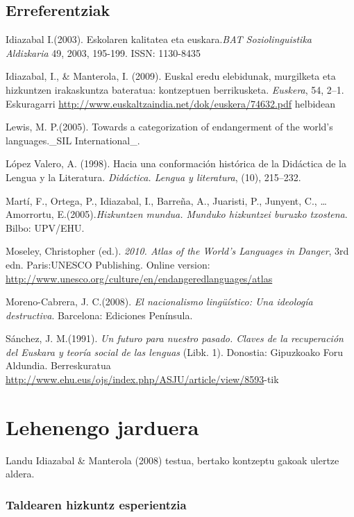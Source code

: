 \documentclass[
]{book}
\begin{document}
\hypertarget{erreferentziak}{%
\section{Erreferentziak}\label{erreferentziak}}

Idiazabal I.(2003). Eskolaren kalitatea eta euskara.\emph{BAT Soziolinguistika Aldizkaria} 49, 2003, 195-199. ISSN: 1130-8435

Idiazabal, I., \& Manterola, I. (2009). Euskal eredu elebidunak, murgilketa eta hizkuntzen irakaskuntza bateratua: kontzeptuen berrikusketa. \emph{Euskera}, 54, 2--1. Eskuragarri \url{http://www.euskaltzaindia.net/dok/euskera/74632.pdf} helbidean

Lewis, M. P.(2005). Towards a categorization of endangerment of the world's languages.\_SIL International\_.

López Valero, A. (1998). Hacia una conformación histórica de la Didáctica de la Lengua y la Literatura. \emph{Didáctica. Lengua y literatura}, (10), 215--232.

Martí, F., Ortega, P., Idiazabal, I., Barreña, A., Juaristi, P., Junyent, C., \ldots{} Amorrortu, E.(2005).\emph{Hizkuntzen mundua. Munduko hizkuntzei buruzko txostena}. Bilbo: UPV/EHU.

Moseley, Christopher (ed.). \emph{2010. Atlas of the World's Languages in Danger}, 3rd edn. Paris:UNESCO Publishing. Online version: \url{http://www.unesco.org/culture/en/endangeredlanguages/atlas}

Moreno-Cabrera, J. C.(2008). \emph{El nacionalismo lingüístico: Una ideología destructiva}. Barcelona: Ediciones Península.

Sánchez, J. M.(1991). \emph{Un futuro para nuestro pasado. Claves de la recuperación del Euskara y teoría social de las lenguas} (Libk. 1). Donostia: Gipuzkoako Foru Aldundia. Berreskuratua \href{http://www.ehu.eus/ojs/index.php/ASJU/article/view/8593-\%28e\%29tik}{http://www.ehu.eus/ojs/index.php/ASJU/article/view/8593}-tik

\hypertarget{lehenengo-jarduera}{%
\chapter*{Lehenengo jarduera}\label{lehenengo-jarduera}}

Landu Idiazabal \& Manterola (2008) testua, bertako kontzeptu gakoak ulertze aldera.

\hypertarget{taldearen-hizkuntz-esperientzia}{%
\subsection{Taldearen hizkuntz esperientzia}\label{taldearen-hizkuntz-esperientzia}}
\end{document}

